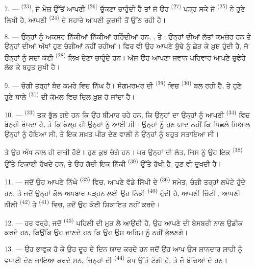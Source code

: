 7. ---  \textsuperscript{(23)}, ਜੋ ਮੇਜ਼ ਉੱਤੋਂ ਆਪਣੀ 
\textsuperscript{(26)} ਚੁੱਕਣਾ ਚਾਹੁੰਦੀ ਹੈ ਤਾਂ ਜੋ ਉਹ 
\textsuperscript{(27)} ਪੜ੍ਹ ਸਕੇ ਜੋ  \textsuperscript{(25)} ਨੇ ਹੁਣੇ ਲਿਖੀ
ਹੈ, ਆਪਣੀ  \textsuperscript{(24)} ਦੇ ਸਹਾਰੇ ਆਪਣੀ ਕੁਰਸੀ ਤੋਂ ਉੱਠ ਰਹੀ ਹੈ।

8. --- ਉਨ੍ਹਾਂ ਨੂੰ ਅਕਸਰ ਨਿੱਕੀਆਂ ਨਿੱਕੀਆਂ  ਰਹਿੰਦੀਆਂ ਹਨ,
,  ਤੇ ; ਉਨ੍ਹਾਂ ਦੀਆਂ ਲੱਤਾਂ ਕਮਜ਼ੋਰ
ਹਨ ਤੇ ਉਨ੍ਹਾਂ ਦੀਆਂ ਅੱਖਾਂ ਹੁਣ ਚੰਗੀਆਂ ਨਹੀਂ ਰਹੀਆਂ। ਫਿਰ ਵੀ ਉਹ ਆਪਣੇ ਬੁੱਢੇ
 ਨੂੰ ਛੇੜ ਕੇ ਖ਼ੁਸ਼ ਹੁੰਦੀ ਹੈ, ਜੋ ਉਨ੍ਹਾਂ ਨੂੰ ਸਦਾ ਕੋਈ 
\textsuperscript{(28)} ਲਿਖ ਦੇਣਾ ਚਾਹੁੰਦੇ ਹਨ। ਅੱਜ ਉਹ ਆਪਣਾ ਜਵਾਨ ਪਰਿਵਾਰ ਆਪਣੇ ਚੁਫੇਰੇ
ਲੱਭ ਕੇ ਬਹੁਤ ਸੁਖੀ ਹੈ।

9. --- ਚੰਗੀ ਤਰ੍ਹਾਂ ਬੰਦ ਕਮਰੇ ਵਿਚ ਨਿੱਘ ਹੈ। ਸੰਗਮਰਮਰ ਦੀ 
\textsuperscript{(29)} ਵਿਚ  \textsuperscript{(30)} ਬਲ ਰਹੀ ਹੈ, ਤੇ
ਹੁਣੇ ਹੁਣੇ ਬਾਲੇ  \textsuperscript{(31)} ਦੀ ਕੋਮਲ  ਵਿਚ ਦਿਲ
ਖ਼ੁਸ਼ ਹੋ ਜਾਂਦਾ ਹੈ।

\VUsaut{4.2mm}
\VUsaut{3.0mm}

10. ---  \textsuperscript{(33)} ਤਕ ਭੁੱਲ ਗਏ ਹਨ ਕਿ ਉਹ ਬੀਮਾਰ ਰਹੇ ਹਨ, ਕਿ
ਉਨ੍ਹਾਂ ਦਾ  ਉਨ੍ਹਾਂ ਨੂੰ ਆਪਣੀ 
\textsuperscript{(34)} ਵਿਚ ਬੰਨ੍ਹੀ ਰੱਖਦਾ ਹੈ, ਤੇ ਕਿ ਕੱਲ੍ਹ ਹੀ ਉਨ੍ਹਾਂ ਨੂੰ
 ਆਈ ਸੀ। ਉਨ੍ਹਾਂ ਨੂੰ ਹੁਣ ਯਾਦ ਨਹੀਂ ਕਿ ਪਿਛਲੇ ਸਿਆਲ ਉਨ੍ਹਾਂ ਨੂੰ
 ਹੋਇਆ ਸੀ, ਤੇ ਇਕ ਸਖ਼ਤ ਪੀੜ ਦੇਣ ਵਾਲੀ  ਨੇ ਉਨ੍ਹਾਂ ਨੂੰ ਬਹੁਤ
ਸਤਾਇਆ ਸੀ।

ਤੇ ਉਹ ਔਖ ਨਾਲ ਹੀ ਰਾਜ਼ੀ ਹੋਏ। ਹੁਣ ਕੁਝ ਚੰਗੇ ਹਨ। ਪਰ ਉਨ੍ਹਾਂ ਦੀ ਲੱਤ, ਜਿਸ ਨੂੰ ਉਹ ਇਕ
 \textsuperscript{(38)} ਉੱਤੇ ਟਿਕਾਈ ਰੱਖਦੇ ਹਨ, ਤੇ ਉਹ ਗੱਦੀ ਇਕ ਨਿੱਕੀ
 \textsuperscript{(39)} ਉੱਤੇ ਰੱਖੀ ਹੈ, ਹੁਣ ਵੀ ਦੁਖਦੀ ਹੈ।

11. --- ਜਦੋਂ ਉਹ ਆਪਣੇ ਨਿੱਘੇ  \textsuperscript{(35)} ਵਿਚ, ਆਪਣੇ
ਵੱਡੇ ਸਿੱਪੀ ਦੇ  \textsuperscript{(36)} ਸਮੇਤ, ਚੰਗੀ ਤਰ੍ਹਾਂ ਲਪੇਟੇ ਹੁੰਦੇ
ਹਨ, ਤੇ ਜਦੋਂ ਉਨ੍ਹਾਂ ਕੋਲ ਅਖ਼ਬਾਰ ਪੜ੍ਹਨ ਲਈ ਉਹ ਨਿੱਕੀ 
\textsuperscript{(40)} ਹੁੰਦੀ ਹੈ, ਆਪਣੀ ਚਿੱਟੀ , ਆਪਣੀ ਨੀਲੀ
 \textsuperscript{(42)} ਤੇ  \textsuperscript{(41)} ਵਿਚ,
ਤਦੋਂ ਉਹ ਕੋਈ ਸ਼ਿਕਾਇਤ ਨਹੀਂ ਕਰਦੇ।

12. --- ਹਰ ਵਰ੍ਹੇ, ਜਦੋਂ  \textsuperscript{(43)} ਪਹਿਲੀ
 ਦੀ  ਮੁੜ ਲੈ ਆਉਂਦੀ ਹੈ, ਉਹ ਆਪਣੇ  ਦੀ
ਬੇਸਬਰੀ ਨਾਲ ਉਡੀਕ ਕਰਦੇ ਹਨ, ਕਿਉਂਕਿ ਉਹ ਜਾਣਦੇ ਹਨ ਕਿ ਉਹ ਉਸ ਅਹਿਮ  ਨੂੰ
ਨਹੀਂ ਭੁੱਲਣਗੇ।

13. --- ਉਹ ਭਾਵੁਕ ਹੋ ਕੇ ਉਹ ਦੂਰ ਦੇ ਦਿਨ ਯਾਦ ਕਰਦੇ ਹਨ ਜਦੋਂ ਉਹ ਆਪ ਉਸ ਸ਼ਾਨਦਾਰ ਸ਼ਾਹੀ
 ਨੂੰ ਵਧਾਈ ਦੇਣ ਜਾਇਆ ਕਰਦੇ ਸਨ, ਜਿਨ੍ਹਾਂ ਦੀ 
\textsuperscript{(44)} ਕੰਧ ਉੱਤੇ ਟੰਗੀ ਹੈ, ਤੇ ਜੋ ਬੱਚਿਆਂ ਦੇ  ਹਨ।
\VUsaut{6.0mm}
\VUfilet{22mm}
